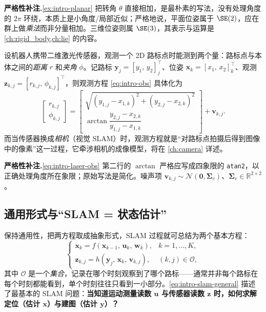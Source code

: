 \begin{note}
\textbf{严格性补注.}\;\cref{ex:intro-planar} 把转角 $\theta$ 直接相加，是最朴素的写法，没有处理角度的 $2\pi$ 环绕，本质上是小角度/局部近似；严格地说，平面位姿属于 $\SE(2)$，应在群上做\emph{乘法}而非分量相加。三维位姿则属 $\SE(3)$，其表示与运算是 \cref{ch:rigid_body,ch:lie} 的内容。
\end{note}

\begin{example}[二维激光观测一个 2D 路标]\label{ex:intro-laser}
设机器人携带二维激光传感器，观测一个 2D 路标点时能测到两个量：路标点与本体之间的\emph{距离} $r$ 和\emph{夹角} $\phi$。记路标 $\mathbf{y}_j=[y_1,\,y_2]_j^\top$、位姿 $\mathbf{x}_k=[x_1,\,x_2]_k^\top$、观测 $\mathbf{z}_{k,j}=[r_{k,j},\,\phi_{k,j}]^\top$，则观测方程 \cref{eq:intro-obs} 具体化为
\begin{equation}
  \begin{bmatrix} r_{k,j}\\[2pt] \phi_{k,j} \end{bmatrix}
  =\begin{bmatrix}
     \sqrt{(y_{1,j}-x_{1,k})^2+(y_{2,j}-x_{2,k})^2}\\[4pt]
     \arctan\dfrac{y_{2,j}-x_{2,k}}{y_{1,j}-x_{1,k}}
   \end{bmatrix}+\mathbf{v}_{k,j}.
  \label{eq:intro-laser-obs}
\end{equation}
而当传感器换成\emph{相机}（视觉 SLAM）时，观测方程就是“对路标点拍摄后得到图像中的像素”这一过程，它牵涉相机的成像模型，将在 \cref{ch:camera} 详述。
\end{example}

\begin{note}
\textbf{严格性补注.}\;\cref{eq:intro-laser-obs} 第二行的 $\arctan$ 严格应写成四象限的 \texttt{atan2}，以正确处理角度所在象限；原始写法是简化。噪声项 $\mathbf{v}_{k,j}\sim\mathcal{N}(\mathbf{0},\boldsymbol{\Sigma}_v)$、$\boldsymbol{\Sigma}_v\in\mathbb{R}^{2\times2}$。
\end{note}

\subsection{通用形式与“SLAM = 状态估计”}
\label{sec:intro-statevar}
保持通用性，把两方程取成抽象形式，SLAM 过程就可总结为两个基本方程\cite{gaoxiang2019slam14}：
\begin{equation}
  \left\{
  \begin{array}{ll}
    \mathbf{x}_k = f\!\left(\mathbf{x}_{k-1},\,\mathbf{u}_k,\,\mathbf{w}_k\right), & k=1,\dots,K,\\[4pt]
    \mathbf{z}_{k,j} = h\!\left(\mathbf{y}_j,\,\mathbf{x}_k,\,\mathbf{v}_{k,j}\right), & (k,j)\in\mathcal{O},
  \end{array}
  \right.
  \label{eq:intro-slam-general}
\end{equation}
其中 $\mathcal{O}$ 是一个\emph{集合}，记录在哪个时刻观察到了哪个路标——通常并非每个路标在每个时刻都能看到，单个时刻往往只看到一小部分。\cref{eq:intro-slam-general} 描述了最基本的 SLAM 问题：\textbf{当知道运动测量读数 $\mathbf{u}$ 与传感器读数 $\mathbf{z}$ 时，如何求解定位（估计 $\mathbf{x}$）与建图（估计 $\mathbf{y}$）？}

